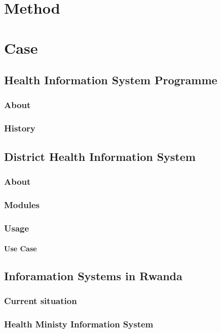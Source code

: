 \chapter{Method}

\chapter{Case}
\section{Health Information System Programme}
\subsection{About}

\subsection{History}

\section{District Health Information System}
\subsection{About}

\subsection{Modules}
\subsection{Usage}
\subsubsection{Use Case}

\section{Inforamation Systems in Rwanda}
\subsection{Current situation}

\subsection{Health Ministy Information System}
